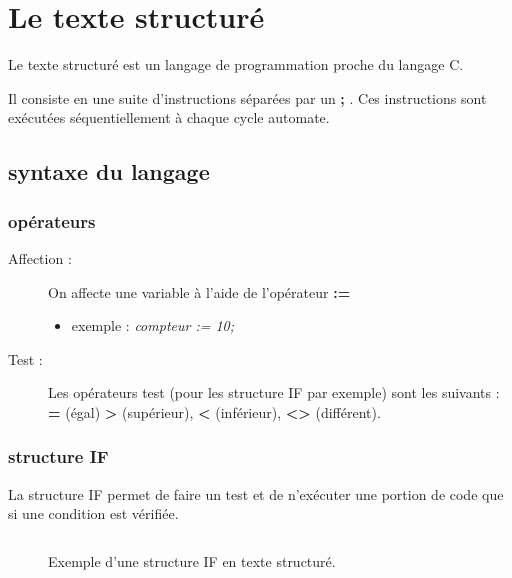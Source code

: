 \section{Le texte structuré}
Le texte structuré est un langage de programmation proche du langage C.

Il consiste en une suite d'instructions séparées par un \textbf{;} . Ces instructions sont exécutées séquentiellement à chaque cycle automate.

\subsection{syntaxe du langage}
\subsubsection{opérateurs}
\begin{description}
  \item [Affection : ] On affecte une variable à l'aide de l'opérateur \textbf{:=}
    \begin{itemize}
      \item exemple : \textit{compteur := 10;}
    \end{itemize}
  \item [Test : ] Les opérateurs test (pour les structure IF par exemple) sont les suivants : \textbf{=} (égal) \textbf{>} (supérieur), \textbf{<} (inférieur), \textbf{<>} (différent).
\end{description}

\subsubsection{structure IF}
La structure IF permet de faire un test et de n'exécuter une portion de code que si une condition est vérifiée.
\begin{figure}[ht]
  \inputminted{C}{texteStructure/structureIF.c}
  \caption{Exemple d'une structure IF en texte structuré.}
\end{figure}
